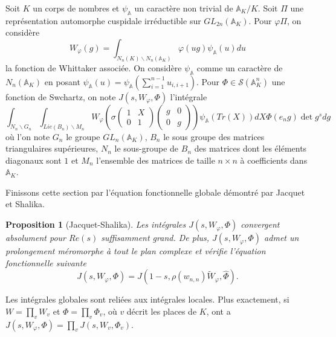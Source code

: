 \documentclass{amsart}
\newtheorem{proposition}{Proposition}[section]
\begin{document}
  Soit $K$ un corps de nombres et $\psi_\mathbb{A}$ un caractère non trivial de $\mathbb{A}_K/K$. Soit $\Pi$ une représentation automorphe cuspidale irréductible sur $GL_{2n}(\mathbb{A}_K)$. Pour $\varphi \Pi$, on considère
  \begin{equation}
  W_\varphi(g) = \int_{N_n(K)\backslash{N_n(\mathbb{A}_K)}} \varphi(ug)\psi_\mathbb{A}(u)du
  \end{equation}
  la fonction de Whittaker associée. On considère $\psi_\mathbb{A}$ comme un caractère de $N_n(\mathbb{A}_K)$ en posant $\psi_\mathbb{A}(u) = \psi_\mathbb{A}(\sum_{i=1}^{n-1} u_{i,i+1})$. Pour $\Phi \in \mathcal{S}(\mathbb{A}_K^n)$ une fonction de Swchartz, on note $J(s, W_\varphi, \Phi)$ l'intégrale
  \begin{equation}
\int_{N_n\backslash{G_n}} \int_{Lie(B_n)\backslash{M_n}} W_\varphi \left(\sigma \begin{pmatrix}
1 & X \\
0 & 1
\end{pmatrix}\begin{pmatrix}
g & 0 \\
0 & g
\end{pmatrix}\right)\psi_\mathbb{A}(Tr(X))dX\Phi(e_ng)\det g^s dg
 \end{equation}
 où l'on note $G_n$ le groupe $GL_n(\mathbb{A}_K)$, $B_n$ le sous groupe des matrices triangulaires supérieures, $N_n$ le sous-groupe de $B_n$ des matrices dont les éléments diagonaux sont $1$ et $M_n$ l'ensemble des matrices de taille $n \times n$ à coefficients dans $\mathbb{A}_K$.
 
  Finissons cette section par l'équation fonctionnelle globale démontré par Jacquet et Shalika.
 \begin{proposition}[Jacquet-Shalika]
 \label{funcglob}
 Les intégrales $J(s, W_\varphi, \Phi)$ convergent absolument pour $Re(s)$ suffisamment grand. De plus, $J(s, W_\varphi, \Phi)$ admet un prolongement méromorphe à tout le plan complexe et vérifie l'équation fonctionnelle suivante
 \begin{equation}
 J(s,W_\varphi,\Phi)=J(1-s, \rho(w_{n,n})\tilde{W}_\varphi, \hat{\Phi}).
 \end{equation}
 \end{proposition}
 
 Les intégrales globales sont reliées aux intégrales locales. Plus exactement, si $W=\prod_v W_v$ et $\Phi = \prod_v \Phi_v$, où $v$ décrit les places de $K$, ont a $J(s,W_\varphi,\Phi)=\prod_v J(s, W_v, \Phi_v)$.
 
\end{document}
